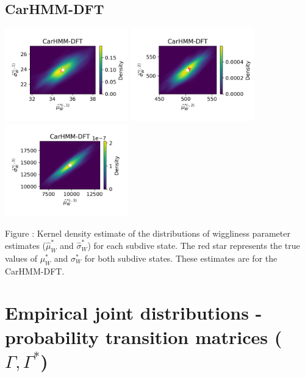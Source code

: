 \documentclass{article}
\begin{document}
        \subsection{CarHMM-DFT}
        \begin{center}
        \includegraphics[width=2.1in]{../Plots/hmm_FV_MLE_density_FoVeDBA_0_0.png}
        \includegraphics[width=2.1in]{../Plots/hmm_FV_MLE_density_FoVeDBA_0_1.png}
        \includegraphics[width=2.1in]{../Plots/hmm_FV_MLE_density_FoVeDBA_0_2.png}
        \end{center}
        
        \noindent Figure : Kernel density estimate of the distributions of wiggliness parameter estimates ($\hat \mu^*_W$ and $\hat \sigma^*_W$) for each subdive state. The red star represents the true values of $\mu^*_W$ and $\sigma^*_W$ for both subdive states. These estimates are for the CarHMM-DFT.
        \addtocounter{fignum}{1}
        
    \newpage
    \section{Empirical joint distributions - probability transition matrices ($\Gamma, \Gamma^*$)}
        
\end{document}
